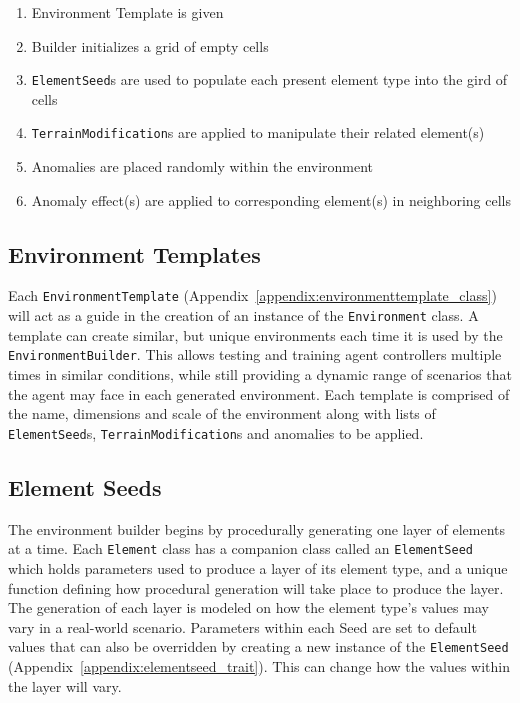 \begin{enumerate}
  \setlength\itemsep{-12pt}
  \item Environment Template is given
  \item	Builder initializes a grid of empty cells
  \item	\texttt{ElementSeed}s are used to populate each present element type into the gird of cells
  \item	\texttt{TerrainModification}s are applied to manipulate their related element(s)
  \item	Anomalies are placed randomly within the environment
  \item	Anomaly effect(s) are applied to corresponding element(s) in neighboring cells
\end{enumerate}


\subsection{Environment Templates} \label{subsec:environment_templates}
Each \texttt{EnvironmentTemplate} (Appendix~\ref{appendix:environmenttemplate_class}) will act as a guide in the creation of an instance of the \texttt{Environment} class.
A template can create similar, but unique environments each time it is used by the \texttt{EnvironmentBuilder}.
This allows testing and training agent controllers multiple times in similar conditions, while still providing a dynamic range of scenarios that the agent may face in each generated environment.
Each template is comprised of the name, dimensions and scale of the environment along with lists of \texttt{ElementSeed}s, \texttt{TerrainModification}s and anomalies to be applied.


\subsection{Element Seeds} \label{subsec:element_seeds}
The environment builder begins by procedurally generating one layer of elements at a time.
Each \texttt{Element} class has a companion class called an \texttt{ElementSeed} which holds parameters used to produce a layer of its element type, and a unique function defining how procedural generation will take place to produce the layer.
The generation of each layer is modeled on how the element type's values may vary in a real-world scenario.
Parameters within each Seed are set to default values that can also be overridden by creating a new instance of the \texttt{ElementSeed} (Appendix~\ref{appendix:elementseed_trait}).
This can change how the values within the layer will vary.



